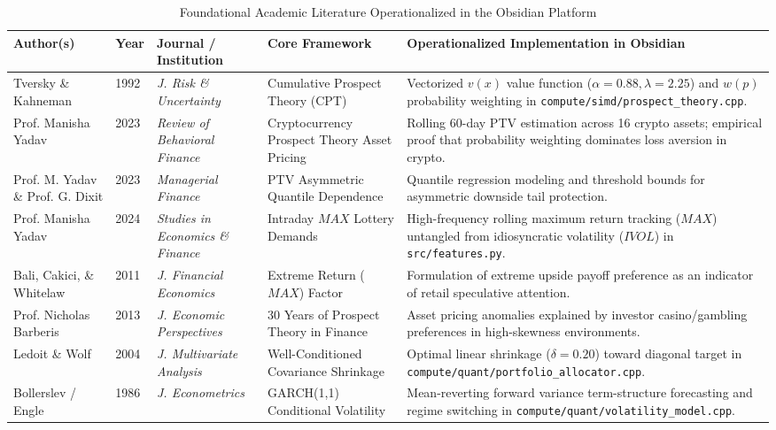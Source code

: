 \documentclass[10pt,journal,compsoc]{IEEEtran}
\begin{document}
\begin{table}[t]
\centering
\caption{Foundational Academic Literature Operationalized in the Obsidian Platform}
\label{tab:cited_literature}
\scriptsize
\begin{tabular}{@{}llllp{6.8cm}@{}}
\toprule
\textbf{Author(s)} & \textbf{Year} & \textbf{Journal / Institution} & \textbf{Core Framework} & \textbf{Operationalized Implementation in Obsidian} \\
\midrule
Tversky \& Kahneman & 1992 & \textit{J. Risk \& Uncertainty} & Cumulative Prospect Theory (CPT) & Vectorized $v(x)$ value function ($\alpha=0.88, \lambda=2.25$) and $w(p)$ probability weighting in \texttt{compute/simd/prospect\_theory.cpp}. \\
Prof. Manisha Yadav & 2023 & \textit{Review of Behavioral Finance} & Cryptocurrency Prospect Theory Asset Pricing & Rolling 60-day PTV estimation across 16 crypto assets; empirical proof that probability weighting dominates loss aversion in crypto. \\
Prof. M. Yadav \& Prof. G. Dixit & 2023 & \textit{Managerial Finance} & PTV Asymmetric Quantile Dependence & Quantile regression modeling and threshold bounds for asymmetric downside tail protection. \\
Prof. Manisha Yadav & 2024 & \textit{Studies in Economics \& Finance} & Intraday $MAX$ Lottery Demands & High-frequency rolling maximum return tracking ($MAX$) untangled from idiosyncratic volatility ($IVOL$) in \texttt{src/features.py}. \\
Bali, Cakici, \& Whitelaw & 2011 & \textit{J. Financial Economics} & Extreme Return ($MAX$) Factor & Formulation of extreme upside payoff preference as an indicator of retail speculative attention. \\
Prof. Nicholas Barberis & 2013 & \textit{J. Economic Perspectives} & 30 Years of Prospect Theory in Finance & Asset pricing anomalies explained by investor casino/gambling preferences in high-skewness environments. \\
Ledoit \& Wolf & 2004 & \textit{J. Multivariate Analysis} & Well-Conditioned Covariance Shrinkage & Optimal linear shrinkage ($\delta = 0.20$) toward diagonal target in \texttt{compute/quant/portfolio\_allocator.cpp}. \\
Bollerslev / Engle & 1986 & \textit{J. Econometrics} & GARCH(1,1) Conditional Volatility & Mean-reverting forward variance term-structure forecasting and regime switching in \texttt{compute/quant/volatility\_model.cpp}. \\
\bottomrule
\end{tabular}
\end{table}
\end{document}

